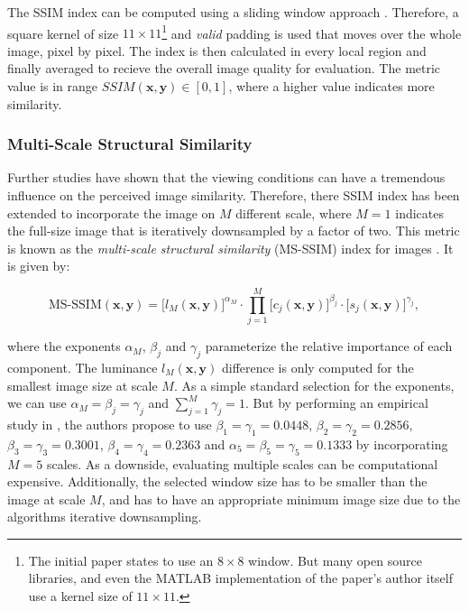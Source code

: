 The SSIM index can be computed using a sliding window approach \parencite{ssim-slide}. Therefore, a square kernel of size $ 11 \times 11 $\footnote{The initial paper states to use an $ 8 \times 8 $ window. But many open source libraries, and even the MATLAB implementation of the paper's author itself use a kernel size of $ 11 \times 11 $.} and \textit{valid} padding is used that moves over the whole image, pixel by pixel. The index is then calculated in every local region and finally averaged to recieve the overall image quality for evaluation. The metric value is in range $ SSIM(\textbf{x}, \textbf{y}) \in [0, 1] $, where a higher value indicates more similarity.

\subsubsection*{Multi-Scale Structural Similarity}

Further studies have shown that the viewing conditions can have a tremendous influence on the perceived image similarity. Therefore, there SSIM index has been extended to incorporate the image on $ M $ different scale, where $ M=1 $ indicates the full-size image that is iteratively downsampled by a factor of two. This metric is known as the \textit{multi-scale structural similarity} (MS-SSIM) index for images \parencite{ms-ssim}. It is given by:

\begin{equation} \label{eq:ms-ssim}
\textrm{MS-SSIM}(\textbf{x}, \textbf{y}) = \big[ l_M(\textbf{x}, \textbf{y})\big]^{\alpha_M} \cdot \prod\limits_{j=1}^{M} \big[c_j(\textbf{x}, \textbf{y}) \big]^{\beta_j} \cdot \big[ s_j(\textbf{x}, \textbf{y}) \big]^{\gamma_j} ,
\end{equation}

where the exponents $ \alpha_M $, $ \beta_j $ and $ \gamma_j $ parameterize the relative importance of each component. The luminance $ l_M(\textbf{x}, \textbf{y}) $ difference is only computed for the smallest image size at scale $ M $. As a simple standard selection for the exponents, we can use $ \alpha_M = \beta_j = \gamma_j $ and $ \sum_{j=1}^{M} \gamma_j = 1 $. But by performing an empirical study in \parencite{ms-ssim}, the authors propose to use $ \beta_1 = \gamma_1 = 0.0448 $, $ \beta_2 = \gamma_2 = 0.2856 $, $ \beta_3 = \gamma_3 = 0.3001 $, $ \beta_4 = \gamma_4 = 0.2363 $ and $ \alpha_5 = \beta_5 = \gamma_5 = 0.1333 $ by incorporating $ M=5 $ scales. As a downside, evaluating multiple scales can be computational expensive. Additionally, the selected window size has to be smaller than the image at scale $ M $, and has to have an appropriate minimum image size due to the algorithms iterative downsampling.


